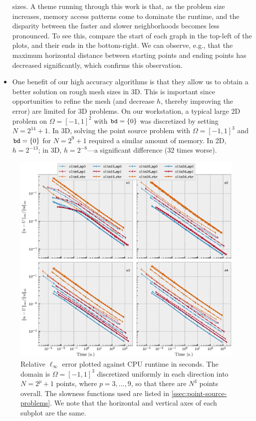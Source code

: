 \documentclass[sisc-eikonal.tex]{subfiles}
\begin{document}
\begin{itemize}
  sizes. A theme running through this work is that, as the problem
  size increases, memory access patterns come to dominate the runtime,
  and the disparity between the faster and slower neighborhoods
  becomes less pronounced. To see this, compare the start of each
  graph in the top-left of the plots, and their ends in the
  bottom-right. We can observe, e.g., that the maximum horizontal
  distance between starting points and ending points has decreased
  significantly, which confirms this observation.
\item One benefit of our high accuracy algorithms is that they allow
  us to obtain a better solution on rough mesh sizes in 3D. This is
  important since opportunities to refine the mesh (and decrease $h$,
  thereby improving the error) are limited for 3D problems. On our
  workstation, a typical large 2D problem on $\Omega = [-1, 1]^2$ with
  $\texttt{bd} = \left\{0\right\}$ was discretized by setting $N = 2^{14} +
  1$. In 3D, solving the point source problem with
  $\Omega = [-1, 1]^3$ and $\texttt{bd} = \left\{0\right\}$ for $N = 2^{9} + 1$
  required a similar amount of memory. In 2D, $h = 2^{-13}$; in 3D,
  $h = 2^{-8}$---a significant difference (32 times worse).
\end{itemize}

\begin{figure}
  \centering \includegraphics[width=\linewidth]{time_vs_error_3d.eps}
  \caption{Relative $\ell_\infty$ error plotted against CPU runtime in
    seconds. The domain is $\Omega = [-1, 1]^3$ discretized uniformly
    in each direction into $N = 2^p + 1$ points, where
    $p = 3, \hdots, 9$, so that there are $N^3$ points overall. The
    slowness functions used are listed in
    \cref{ssec:point-source-problems}. We note that the horizontal and
    vertical axes of each subplot are the
    same.}\label{fig:time-vs-error}
\end{figure}
\end{document}
